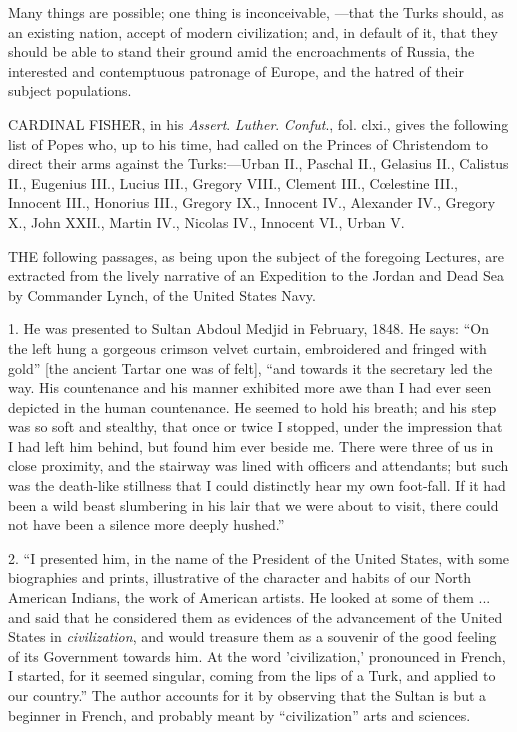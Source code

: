 Many things are possible; one
thing is inconceivable, —that the Turks should, as an existing
nation, accept of modern civilization; and, in default of it, that
they should be able to stand their ground amid the encroachments of
Russia, the interested and contemptuous patronage of Europe, and the
hatred of their subject populations.



CARDINAL
FISHER, in his \emph{Assert}. \emph{Luther}. \emph{Confut}.,
fol. clxi., gives the following list of Popes who, up to his time, had
called on the Princes of Christendom to direct their arms against the
Turks:—Urban II., Paschal II., Gelasius II., Calistus II., Eugenius
III., Lucius III., Gregory VIII., Clement III., Cœlestine III.,
Innocent III., Honorius III., Gregory IX., Innocent IV., Alexander
IV., Gregory X., John XXII., Martin IV., Nicolas IV., Innocent VI.,
Urban V.


THE
following passages, as being upon the subject of the foregoing
Lectures, are extracted from the lively narrative of an Expedition to
the Jordan and Dead Sea by Commander Lynch, of the United States Navy.

1. He was presented to Sultan
Abdoul Medjid in February, 1848. He says: ``On the left hung a gorgeous
crimson velvet curtain, embroidered and fringed with gold'' [the
ancient Tartar one was of felt], ``and towards it the secretary led the
way. His countenance and his manner exhibited more awe than I had ever
seen depicted in the human countenance. He seemed to hold his breath;
and his step was so soft and stealthy, that once or twice I stopped,
under the impression that I had left him behind, but found him ever
beside me. There were three of us in close proximity, and the stairway
was lined with officers and attendants; but such was the death-like
stillness that I could distinctly hear my own foot-fall. If it had
been a wild beast slumbering in his lair that we were about to visit,
there could not have been a silence more deeply hushed.''

2. ``I presented him, in the
name of the President of the United States, with some biographies and
prints, illustrative of the character and habits of our North American
Indians, the work of American artists. He looked at some of them ...
and said that he considered them as evidences of the advancement of
the United States in \emph{civilization}, and would treasure them as a
souvenir of the good feeling of its Government towards him. At
the word 'civilization,' pronounced in French, I started, for it
seemed singular, coming from the lips of a Turk, and applied to our
country.'' The author accounts for it by observing that the Sultan is
but a beginner in French, and probably meant by ``civilization'' arts
and sciences.


